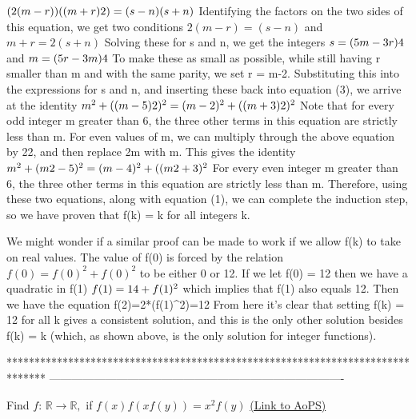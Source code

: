\begin{solution}
$(2(m-r))((m+r)\/2)=(s-n)(s+n)$
Identifying the factors on the two sides of this equation, we get two conditions
$2(m-r)=(s-n)$ and $m+r=2(s+n)$
Solving these for s and n, we get the integers
$s=(5m-3r)\/4$ and $m=(5r-3m)\/4$
To make these as small as possible, while still having r smaller than m and with the same parity, we set r = m-2. Substituting this into the expressions for s and n, and inserting these back into equation (3), we arrive at the identity
$m^2+((m-5)\/2)^2=(m-2)^2+((m+3)\/2)^2$
Note that for every odd integer m greater than 6, the three other terms in this equation are strictly less than m. For even values of m, we can multiply through the above equation by 22, and then replace 2m with m. This gives the identity
$m^2+(m\/2-5)^2=(m-4)^2+((m\/2+3)^2$
For every even integer m greater than 6, the three other terms in this equation are strictly less than m. Therefore, using these two equations, along with equation (1), we can complete the induction step, so we have proven that f(k) = k for all integers k.

 

We might wonder if a similar proof can be made to work if we allow f(k) to take on real values. The value of f(0) is forced by the relation
$f(0)=f(0)^2+f(0)^2$
to be either 0 or 1\/2. If we let f(0) = 1\/2 then we have a quadratic in f(1)
$f(1)=1\/4+f(1)^2$
which implies that f(1) also equals 1\/2. Then we have the equation
f(2)=2*(f(1)^2)=1\/2
From here it's clear that setting f(k) = 1\/2 for all k gives a consistent solution, and this is the only other solution besides f(k) = k (which, as shown above, is the only solution for integer functions).

\end{solution}
*******************************************************************************
-------------------------------------------------------------------------------

\begin{problem}
	Find $f$: $\mathbb{R} \to \mathbb{R},$ if $f(x) f(xf(y)) = x^2 f(y)$
	\flushright \href{https://artofproblemsolving.com/community/c6h1626253}{(Link to AoPS)}
\end{problem}




